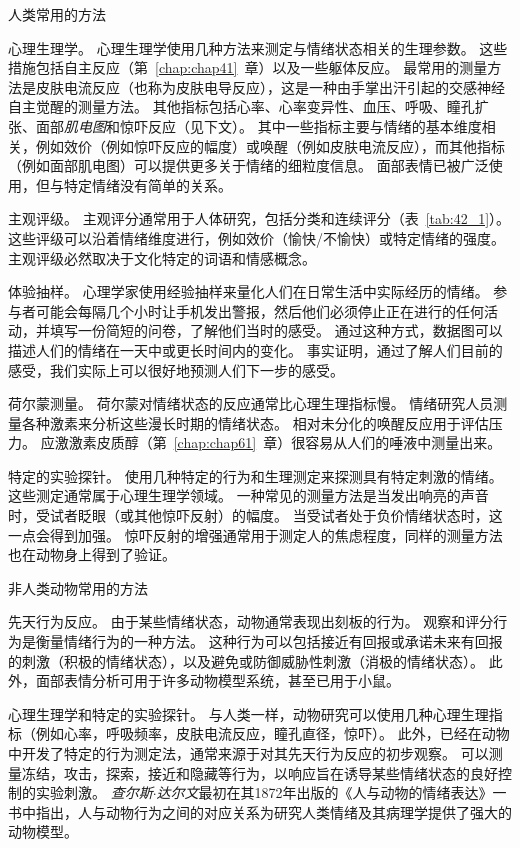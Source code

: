 \begin{proposition}[测量情绪的方法] \label{box:42_1}
	
	\quad \quad 人类常用的方法
	
	\quad \quad 心理生理学。
	心理生理学使用几种方法来测定与情绪状态相关的生理参数。
	这些措施包括自主反应（第~\ref{chap:chap41}~章）以及一些躯体反应。
	最常用的测量方法是皮肤电流反应（也称为皮肤电导反应），这是一种由手掌出汗引起的交感神经自主觉醒的测量方法。
	其他指标包括心率、心率变异性、血压、呼吸、瞳孔扩张、面部\textit{肌电图}和惊吓反应（见下文）。
	其中一些指标主要与情绪的基本维度相关，例如效价（例如惊吓反应的幅度）或唤醒（例如皮肤电流反应），而其他指标（例如面部肌电图）可以提供更多关于情绪的细粒度信息。
	面部表情已被广泛使用，但与特定情绪没有简单的关系。
	
	\quad \quad 主观评级。
	主观评分通常用于人体研究，包括分类和连续评分（表~\ref{tab:42_1}）。
	这些评级可以沿着情绪维度进行，例如效价（愉快/不愉快）或特定情绪的强度。
	主观评级必然取决于文化特定的词语和情感概念。
	
	\quad \quad 体验抽样。
	心理学家使用经验抽样来量化人们在日常生活中实际经历的情绪。
	参与者可能会每隔几个小时让手机发出警报，然后他们必须停止正在进行的任何活动，并填写一份简短的问卷，了解他们当时的感受。
	通过这种方式，数据图可以描述人们的情绪在一天中或更长时间内的变化。
	事实证明，通过了解人们目前的感受，我们实际上可以很好地预测人们下一步的感受。
	
	\quad \quad 荷尔蒙测量。
	荷尔蒙对情绪状态的反应通常比心理生理指标慢。
	情绪研究人员测量各种激素来分析这些漫长时期的情绪状态。
	相对未分化的唤醒反应用于评估压力。
	应激激素皮质醇（第~\ref{chap:chap61}~章）很容易从人们的唾液中测量出来。
	
	\quad \quad 特定的实验探针。
	使用几种特定的行为和生理测定来探测具有特定刺激的情绪。
	这些测定通常属于心理生理学领域。
	一种常见的测量方法是当发出响亮的声音时，受试者眨眼（或其他惊吓反射）的幅度。
	当受试者处于负价情绪状态时，这一点会得到加强。
	惊吓反射的增强通常用于测定人的焦虑程度，同样的测量方法也在动物身上得到了验证。
	
	\quad \quad 非人类动物常用的方法
	
	\quad \quad 先天行为反应。
	由于某些情绪状态，动物通常表现出刻板的行为。
	观察和评分行为是衡量情绪行为的一种方法。
	这种行为可以包括接近有回报或承诺未来有回报的刺激（积极的情绪状态），以及避免或防御威胁性刺激（消极的情绪状态）。
	此外，面部表情分析可用于许多动物模型系统，甚至已用于小鼠。
	
	\quad \quad 心理生理学和特定的实验探针。
	与人类一样，动物研究可以使用几种心理生理指标（例如心率，呼吸频率，皮肤电流反应，瞳孔直径，惊吓）。
	此外，已经在动物中开发了特定的行为测定法，通常来源于对其先天行为反应的初步观察。
	可以测量冻结，攻击，探索，接近和隐藏等行为，以响应旨在诱导某些情绪状态的良好控制的实验刺激。
	\textit{查尔斯$\cdot$达尔文}最初在其1872年出版的《人与动物的情绪表达》一书中指出，人与动物行为之间的对应关系为研究人类情绪及其病理学提供了强大的动物模型。
	
\end{proposition}


